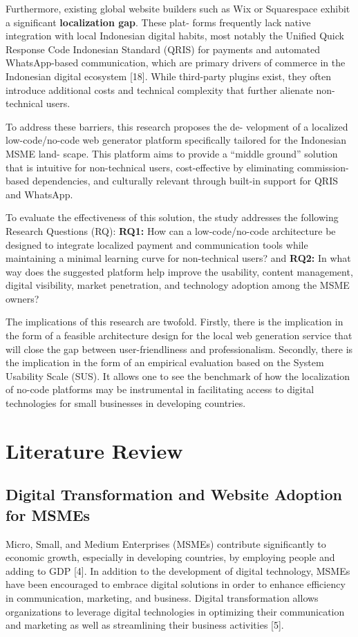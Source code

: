 \documentclass[conference]{IEEEtran}
\begin{document}
Furthermore, existing global website builders such as Wix or Squarespace exhibit a significant \textbf{localization gap}. These plat- forms frequently lack native integration with local Indonesian digital habits, most notably the Unified Quick Response Code Indonesian Standard (QRIS) for payments and automated WhatsApp-based communication, which are primary drivers of commerce in the Indonesian digital ecosystem [18]. While third-party plugins exist, they often introduce additional costs and technical complexity that further alienate non-technical users.

To address these barriers, this research proposes the de- velopment of a localized low-code/no-code web generator platform specifically tailored for the Indonesian MSME land- scape. This platform aims to provide a “middle ground” solution that is intuitive for non-technical users, cost-effective by eliminating commission-based dependencies, and culturally relevant through built-in support for QRIS and WhatsApp.

To evaluate the effectiveness of this solution, the study addresses the following Research Questions (RQ): \textbf{RQ1:} How can a low-code/no-code architecture be designed to integrate localized payment and communication tools while maintaining a minimal learning curve for non-technical users? and \textbf{RQ2:} In what way does the suggested platform help improve the usability, content management, digital visibility, market penetration, and technology adoption among the MSME owners?

The implications of this research are twofold. Firstly, there is the implication in the form of a feasible architecture design for the local web generation service that will close the gap between user-friendliness and professionalism. Secondly, there is the implication in the form of an empirical evaluation based on the System Usability Scale (SUS). It allows one to see the benchmark of how the localization of no-code platforms may be instrumental in facilitating access to digital technologies for small businesses in developing countries.

\section{Literature Review}

\subsection{Digital Transformation and Website Adoption for MSMEs}
Micro, Small, and Medium Enterprises (MSMEs) contribute significantly to economic growth, especially in developing countries, by employing people and adding to GDP [4]. In addition to the development of digital technology, MSMEs have been encouraged to embrace digital solutions in order to enhance efficiency in communication, marketing, and business. Digital transformation allows organizations to leverage digital technologies in optimizing their communication and marketing as well as streamlining their business activities [5].
\end{document}

